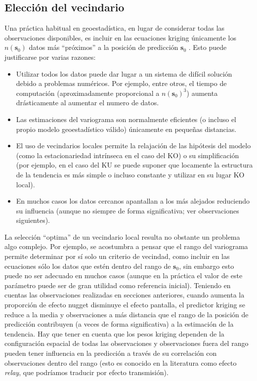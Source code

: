 \documentclass[
  spanish,
]{book}
\providecommand{\tightlist}{%
  \setlength{\itemsep}{0pt}\setlength{\parskip}{0pt}}
\theoremstyle{break}
\theoremstyle{definition}
\theoremstyle{definition}
\theoremstyle{definition}
\theoremstyle{definition}
\theoremstyle{remark}
\begin{document}
\hypertarget{eleccion-vecindario}{%
\subsection{Elección del vecindario}\label{eleccion-vecindario}}

Una práctica habitual en geoestadística, en lugar de considerar todas las observaciones disponibles, es incluir en las ecuaciones kriging únicamente los \(n(\mathbf{s}_{0})\) datos más ``próximos'' a la posición de predicción \(\mathbf{s}_{0}\) .
Esto puede justificarse por varias razones:

\begin{itemize}
\tightlist
\item
  Utilizar todos los datos puede dar lugar a un sistema de difícil solución debido a problemas numéricos. Por ejemplo, entre otros, el tiempo de computación (aproximadamente proporcional a \(n(\mathbf{s}_{0})^{3}\)) aumenta drásticamente al aumentar el numero de datos.
\item
  Las estimaciones del variograma son normalmente eficientes (o incluso el propio modelo geoestadístico válido) únicamente en pequeñas distancias.
\item
  El uso de vecindarios locales permite la relajación de las hipótesis del modelo (como la estacionariedad intrínseca en el caso del KO) o su simplificación (por ejemplo, en el caso del KU se puede suponer que locamente la estructura de la tendencia es más simple o incluso constante y utilizar en su lugar KO local).
\item
  En muchos casos los datos cercanos apantallan a los más alejados
  reduciendo su influencia (aunque no siempre de forma significativa; ver
  observaciones siguientes).
\end{itemize}

La selección ``optima'' de un vecindario local resulta no obstante un problema algo complejo. Por ejemplo, se acostumbra a pensar que el rango del variograma permite determinar por sí solo un criterio de vecindad, como incluir en las ecuaciones sólo los datos que estén dentro del rango de \(\mathbf{s}_{0}\), sin embargo esto puede no ser adecuado en muchos casos (aunque en la práctica el valor de este parámetro puede ser de gran utilidad como referencia inicial).
Teniendo en cuentas las observaciones realizadas en secciones anteriores, cuando aumenta la proporción de efecto nugget disminuye el efecto pantalla, el predictor kriging se reduce a la media y observaciones a más distancia que el rango de la posición de predicción contribuyen (a veces de forma significativa) a la estimación de la tendencia.
Hay que tener en cuenta que los pesos kriging dependen de la configuración espacial de todas las observaciones y observaciones fuera del rango pueden tener influencia en la predicción a través de su correlación con observaciones dentro del rango (esto es conocido en la literatura como efecto \emph{relay}, que podríamos traducir por efecto transmisión).
\end{document}
